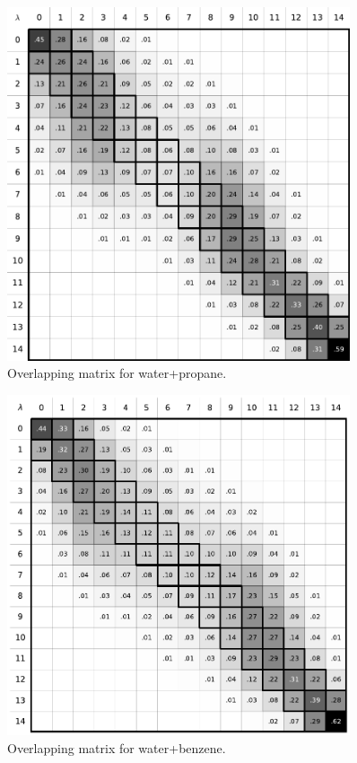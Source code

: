 \documentclass[
	12pt,				%
	openany,			%
	oneside,			%
	a4paper,			%
	english,			%
	brazil				%
	]{abntex2}
\begin{document}
\begin{apendicesenv}
\begin{figure}[H]
	\centering
	\includegraphics[width=0.9\textwidth]{Figures/owat_prop}
	\caption{Overlapping matrix for water+propane.}
\end{figure}

\begin{figure}[H]
	\centering
	\includegraphics[width=0.9\textwidth]{Figures/owat_benz}
	\caption{Overlapping matrix for water+benzene.}
\end{figure}


\end{apendicesenv}
\end{document}
